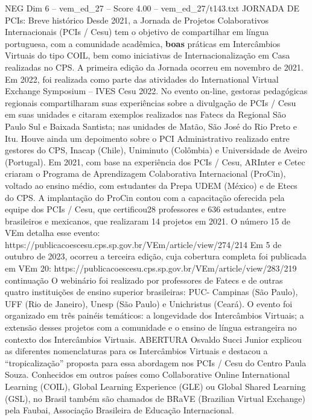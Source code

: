 \begin{textsample}{NEG Dim 6 – vem\_ed\_27 – Score 4.00 – vem\_ed\_27/t143.txt}  \label{ex:f6_neg_013}
JORNADA DE PCIs: Breve histórico Desde 2021, a Jornada de Projetos Colaborativos Internacionais (PCIs / Cesu) tem o objetivo de compartilhar em língua portuguesa, com a comunidade acadêmica, \textbf{boas} práticas em Intercâmbios Virtuais do tipo COIL, bem como iniciativas de Internacionalização em Casa realizadas no CPS.
A primeira edição da Jornada ocorreu em novembro de 2021.
Em 2022, foi realizada como parte das atividades do International Virtual Exchange Symposium – IVES Cesu 2022.
No evento on-line, gestoras pedagógicas regionais compartilharam suas experiências sobre a divulgação de PCIs / Cesu em suas unidades e citaram exemplos realizados nas Fatecs da Regional São Paulo Sul e Baixada Santista; nas unidades de Matão, São José do Rio Preto e Itu.
Houve ainda um depoimento sobre o PCI Administrativo realizado entre gestores do CPS, Inacap (Chile), Uniminuto (Colômbia) e Universidade de Aveiro (Portugal).
Em 2021, com base na experiência dos PCIs / Cesu, ARInter e Cetec criaram o Programa de Aprendizagem Colaborativa Internacional (ProCin), voltado ao ensino médio, com estudantes da Prepa UDEM (México) e de Etecs do CPS.
A implantação do ProCin contou com a capacitação oferecida pela equipe dos PCIs / Cesu, que certificou28 professores e 636 estudantes, entre brasileiros e mexicanos, que realizaram 14 projetos em 2021.
O número 15 de VEm detalha esse evento: https://publicacoescesu.cps.sp.gov.br/VEm/article/view/274/214 Em 5 de outubro de 2023, ocorreu a terceira edição, cuja cobertura completa foi publicada em VEm 20: https://publicacoescesu.cps.sp.gov.br/VEm/article/view/283/219 continuação O webinário foi realizado por professores de Fatecs e de outras quatro instituições de ensino superior brasileiras: PUC- Campinas (São Paulo), UFF (Rio de Janeiro), Unesp (São Paulo) e Unichristus (Ceará).
O evento foi organizado em três painéis temáticos: a longevidade dos Intercâmbios Virtuais; a extensão desses projetos com a comunidade e o ensino de língua estrangeira no contexto dos Intercâmbios Virtuais.
ABERTURA Osvaldo Succi Junior explicou as diferentes nomenclaturas para os Intercâmbios Virtuais e destacou a “tropicalização” proposta para essa abordagem nos PCIs / Cesu do Centro Paula Souza.
Conhecidos em outros países como Collaborative Online International Learning (COIL), Global Learning Experience (GLE) ou Global Shared Learning (GSL), no Brasil também são chamados de BRaVE (Brazilian Virtual Exchange) pela Faubai, Associação Brasileira de Educação Internacional.

\end{textsample}
